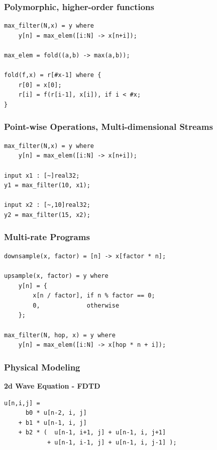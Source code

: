 \documentclass{beamer}
\begin{document}
\begin{frame}[fragile]
\frametitle{Polymorphic, higher-order functions}

\begin{center}
\begin{BVerbatim}
max_filter(N,x) = y where
    y[n] = max_elem([i:N] -> x[n+i]);

max_elem = fold((a,b) -> max(a,b));

fold(f,x) = r[#x-1] where {
    r[0] = x[0];
    r[i] = f(r[i-1], x[i]), if i < #x;
}
\end{BVerbatim}
\end{center}

\end{frame}



\begin{frame}[fragile]
\frametitle{Point-wise Operations, Multi-dimensional Streams}

\begin{center}
\begin{BVerbatim}
max_filter(N,x) = y where
    y[n] = max_elem([i:N] -> x[n+i]);

input x1 : [~]real32;
y1 = max_filter(10, x1);

input x2 : [~,10]real32;
y2 = max_filter(15, x2);
\end{BVerbatim}
\end{center}

\end{frame}


\begin{frame}[fragile]
\frametitle{Multi-rate Programs}

\begin{center}
\begin{BVerbatim}
downsample(x, factor) = [n] -> x[factor * n];

upsample(x, factor) = y where
    y[n] = {
        x[n / factor], if n % factor == 0;
        0,             otherwise
    };

max_filter(N, hop, x) = y where
    y[n] = max_elem([i:N] -> x[hop * n + i]);
\end{BVerbatim}
\end{center}

\end{frame}


\begin{frame}[fragile]
\frametitle{Physical Modeling}

\textbf{2d Wave Equation - FDTD\footnotemark}
\begin{center}
\begin{BVerbatim}
u[n,i,j] =
      b0 * u[n-2, i, j]
    + b1 * u[n-1, i, j]
    + b2 * (  u[n-1, i+1, j] + u[n-1, i, j+1]
            + u[n-1, i-1, j] + u[n-1, i, j-1] );
\end{BVerbatim}
\end{center}

\end{frame}
\end{document}

